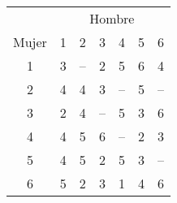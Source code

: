 \begin{table}[H]
\centering
\begin{tabular}{c|cccccc}
      & \multicolumn{6}{c}{Hombre} \\ 
Mujer & 1  & 2  & 3  & 4  & 5  & 6 \\ \hline
1     & 3  & –  & 2  & 5  & 6  & 4 \\
2     & 4  & 4  & 3  & –  & 5  & – \\
3     & 2  & 4  & –  & 5  & 3  & 6 \\
4     & 4  & 5  & 6  & –  & 2  & 3 \\
5     & 4  & 5  & 2  & 5  & 3  & – \\
6     & 5  & 2  & 3  & 1  & 4  & 6 \\ \hline
\end{tabular}
\label{tabla:3}
\end{table}
